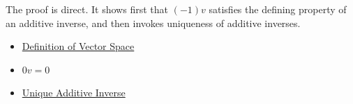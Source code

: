\begin{remark*}
The proof is direct. It shows first that $(-1)v$ satisfies the defining property of an additive inverse, and then invokes uniqueness of additive inverses.
\end{remark*}

\begin{dependencies}
\hfill
\begin{itemize}
  \item \hyperref[def:vector-space]{Definition of Vector Space}
  \item \hyperref[thm:zero-scalar-times-vector]{$0v=0$}
  \item \hyperref[thm:unique-additive-inverse]{Unique Additive Inverse}
\end{itemize}
\end{dependencies}
